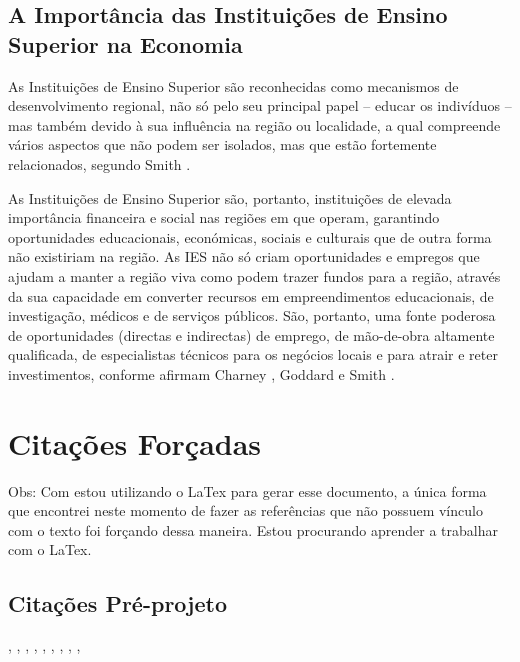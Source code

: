 
\subsection{A Importância das Instituições de Ensino Superior na Economia}

As Instituições de Ensino Superior são reconhecidas como mecanismos de desenvolvimento regional, não só pelo seu principal papel – educar os indivíduos – mas também devido à sua influência na região ou localidade, a qual compreende vários aspectos que não podem ser isolados, mas que estão fortemente relacionados, segundo Smith \cite{Smith2006TheSystem}. 

As Instituições de Ensino Superior são, portanto, instituições de elevada importância financeira e social nas regiões em que operam, garantindo oportunidades educacionais, económicas, sociais e culturais que de outra forma não existiriam na região. As IES não só criam oportunidades e empregos que ajudam a manter a região viva como podem trazer fundos para a região, através da sua capacidade em converter recursos em empreendimentos educacionais, de investigação, médicos e de serviços públicos. São, portanto, uma fonte poderosa de oportunidades (directas e indirectas) de emprego, de mão-de-obra altamente qualificada, de especialistas técnicos para os negócios locais e para atrair e reter investimentos, conforme afirmam Charney \cite{Charney2003UniversityEconomy}, Goddard \cite{Goddard1987UniversitiesOverview} e Smith \cite{Smith2006TheSystem}. 








\section{Citações Forçadas}%
 Obs: Com estou utilizando o LaTex para gerar esse documento, a única forma que encontrei neste momento de fazer as referências que não possuem vínculo com o texto foi forçando dessa maneira. Estou procurando aprender a trabalhar com o LaTex.

 \subsection{Citações Pré-projeto}
    
   \cite{Bleicher2016PoliticasFederais},%
   \cite{MarreiroBarbosa2013DesempenhoHemoglobina},%
   \cite{Santos2016ASocial},%
   \cite{SilvaMachado2012SistemaEducation},%
   \cite{CarolinaLilideAssis2013ASBRASILEIRAS},%
   \cite{HartmannLeibovich2015AvaliacaoUnB},%
   \cite{GuedesdaSilva2017EvasaoInstitucionais},%
   \cite{Antonio2017AnaliseCeara},%
   \cite{Freitas2015AvaliacaoEducacional},%
   \cite{Vieira2016AvaliacaoBrasilia}%

